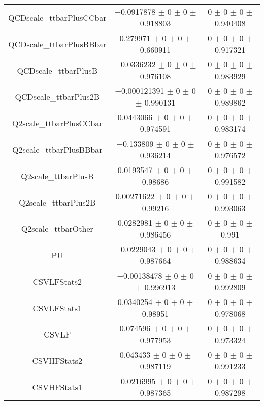 \begin{table}
\begin{tabular}{ccc}
QCDscale\_ttbarPlusCCbar & \num{-0.0917878} $\pm$ \num{0} $\pm$ \num{0} $\pm$ \num{0.918803} & \num{0} $\pm$ \num{0} $\pm$ \num{0} $\pm$ \num{0.940408}\\
QCDscale\_ttbarPlusBBbar & \num{0.279971} $\pm$ \num{0} $\pm$ \num{0} $\pm$ \num{0.660911} & \num{0} $\pm$ \num{0} $\pm$ \num{0} $\pm$ \num{0.917321}\\
QCDscale\_ttbarPlusB & \num{-0.0336232} $\pm$ \num{0} $\pm$ \num{0} $\pm$ \num{0.976108} & \num{0} $\pm$ \num{0} $\pm$ \num{0} $\pm$ \num{0.983929}\\
QCDscale\_ttbarPlus2B & \num{-0.000121391} $\pm$ \num{0} $\pm$ \num{0} $\pm$ \num{0.990131} & \num{0} $\pm$ \num{0} $\pm$ \num{0} $\pm$ \num{0.989862}\\
Q2scale\_ttbarPlusCCbar & \num{0.0443066} $\pm$ \num{0} $\pm$ \num{0} $\pm$ \num{0.974591} & \num{0} $\pm$ \num{0} $\pm$ \num{0} $\pm$ \num{0.983174}\\
Q2scale\_ttbarPlusBBbar & \num{-0.133809} $\pm$ \num{0} $\pm$ \num{0} $\pm$ \num{0.936214} & \num{0} $\pm$ \num{0} $\pm$ \num{0} $\pm$ \num{0.976572}\\
Q2scale\_ttbarPlusB & \num{0.0193547} $\pm$ \num{0} $\pm$ \num{0} $\pm$ \num{0.98686} & \num{0} $\pm$ \num{0} $\pm$ \num{0} $\pm$ \num{0.991582}\\
Q2scale\_ttbarPlus2B & \num{0.00271622} $\pm$ \num{0} $\pm$ \num{0} $\pm$ \num{0.99216} & \num{0} $\pm$ \num{0} $\pm$ \num{0} $\pm$ \num{0.993063}\\
Q2scale\_ttbarOther & \num{0.0282981} $\pm$ \num{0} $\pm$ \num{0} $\pm$ \num{0.986456} & \num{0} $\pm$ \num{0} $\pm$ \num{0} $\pm$ \num{0.991}\\
PU & \num{-0.0229043} $\pm$ \num{0} $\pm$ \num{0} $\pm$ \num{0.987664} & \num{0} $\pm$ \num{0} $\pm$ \num{0} $\pm$ \num{0.988634}\\
CSVLFStats2 & \num{-0.00138478} $\pm$ \num{0} $\pm$ \num{0} $\pm$ \num{0.996913} & \num{0} $\pm$ \num{0} $\pm$ \num{0} $\pm$ \num{0.992809}\\
CSVLFStats1 & \num{0.0340254} $\pm$ \num{0} $\pm$ \num{0} $\pm$ \num{0.98951} & \num{0} $\pm$ \num{0} $\pm$ \num{0} $\pm$ \num{0.978068}\\
CSVLF & \num{0.074596} $\pm$ \num{0} $\pm$ \num{0} $\pm$ \num{0.977953} & \num{0} $\pm$ \num{0} $\pm$ \num{0} $\pm$ \num{0.973324}\\
CSVHFStats2 & \num{0.043433} $\pm$ \num{0} $\pm$ \num{0} $\pm$ \num{0.987119} & \num{0} $\pm$ \num{0} $\pm$ \num{0} $\pm$ \num{0.991233}\\
CSVHFStats1 & \num{-0.0216995} $\pm$ \num{0} $\pm$ \num{0} $\pm$ \num{0.987365} & \num{0} $\pm$ \num{0} $\pm$ \num{0} $\pm$ \num{0.987298}\\

\end{tabular}
\end{table}
